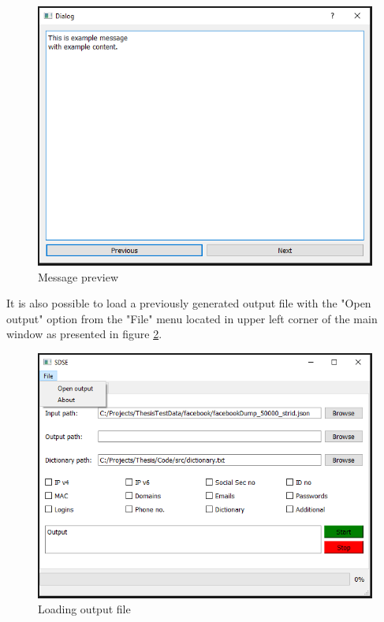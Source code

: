 \documentclass[a4paper,twoside,12pt]{book}
\begin{document}
\begin{figure}
\centering
\includegraphics{MessagePrev}
\caption{Message preview}
\label{fig:MessagePrev}
\end{figure}

It is also possible to load a previously generated output file with the "Open output" option from the
"File" menu located in upper left corner of the main window as presented in figure \ref{fig:OpeningOutput}.

\begin{figure}
\centering
\includegraphics{OpeningOutput}
\caption{Loading output file}
\label{fig:OpeningOutput}
\end{figure}
\end{document}
